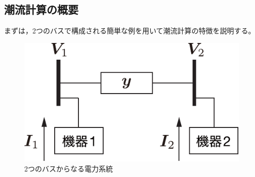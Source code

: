 \documentclass[tombow,dvipdfmx]{corona-a5}
\begin{document}
\subsection{潮流計算の概要}\label{sec:pfcal}

まずは，2つのバスで構成される簡単な例を用いて潮流計算の特徴を説明する。

\begin{figure}[t]
\centering
\includegraphics[width = .25\linewidth]{figs/2busex}
\caption{2つのバスからなる電力系統}
\label{fig:2buspf}
\end{figure}
\end{document}
